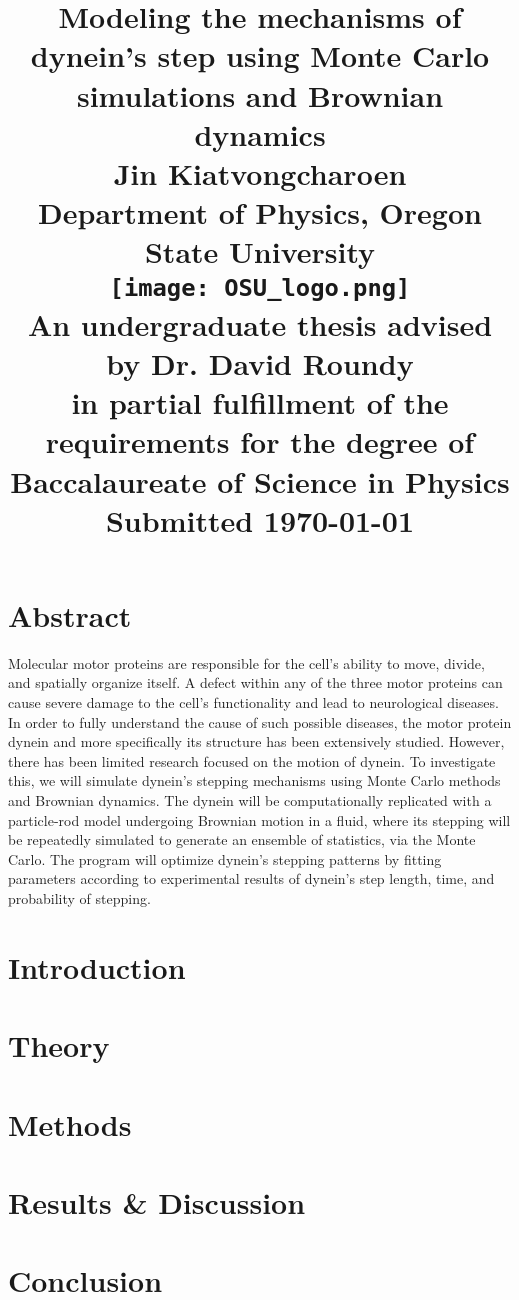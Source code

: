\documentclass[12pt]{report}
\title{
	\Huge{Modeling the mechanisms of dynein's step using Monte Carlo simulations and Brownian dynamics}\vspace{1em}\\
	\Large{Jin Kiatvongcharoen} \vspace{0.5em}\\ 
	\normalsize{Department of Physics, Oregon State University}\vspace{2em}\\
	\texttt{[image: OSU\_logo.png]}\vspace{1em}\\
	\normalsize{An undergraduate thesis advised by Dr. David Roundy}\\
	\normalsize{in partial fulfillment of the requirements for the degree of}\\
	\normalsize{Baccalaureate of Science in Physics}\vspace{1.5 em}\\
	\normalsize{Submitted \today}\\


}
\date{}
\begin{document}
    \maketitle
    \onehalfspacing


	\chapter*{Abstract}
	Molecular motor proteins are responsible for the cell’s ability to move, divide, and spatially organize itself. A defect within any of the three motor proteins can cause severe damage to the cell’s functionality and lead to neurological diseases. In order to fully understand the cause of such possible diseases, the motor protein dynein and more specifically its structure has been extensively studied. However, there has been limited research focused on the motion of dynein. To investigate this, we will simulate dynein’s stepping mechanisms using Monte Carlo methods and Brownian dynamics. The dynein will be computationally replicated with a particle-rod model undergoing Brownian motion in a fluid, where its stepping will be repeatedly simulated to generate an ensemble of statistics, via the Monte Carlo. The program will optimize dynein’s stepping patterns by fitting parameters according to experimental results of dynein’s step length, time, and probability of stepping. 
	
    \begin{spacing}{1.2}
	\tableofcontents
	\listoffigures
	\end{spacing}
	
	
	\chapter{Introduction}
	
	\chapter{Theory}
	
	\chapter{Methods}
	
	\chapter{Results \& Discussion}
	
	\chapter{Conclusion}
	


\newpage
\cite{Burgess2003} \cite{Cianfrocco2015mechanism} \cite{Dewitt2012} \cite{Capek2017, waczak2019drunken}
\cite{GoodsellArt} \cite{eschbach2011cytoplasmic}
\cite{rao2019molecular} \cite{manna2020mechanistic} \cite{desantis2017lis1} 
\cite{elshenawy2020lis1} \cite{ando2020small} \cite{kinoshita2018step} \cite{qiu2012dynein} \cite{muller1973dynamic} \cite{lim2007vorticity} \cite{fehr2008kinesin} \cite{trott2018mathematical}




\end{document}
